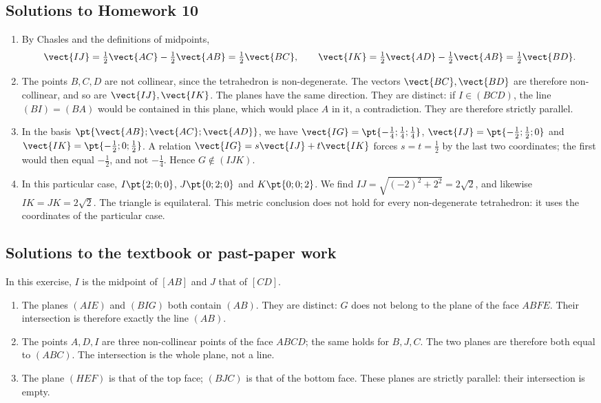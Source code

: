 \subsection{Solutions to Homework 10}\begin{enumerate}
\item By Chasles and the definitions of midpoints,
\[\vect{IJ}=\tfrac12\vect{AC}-\tfrac12\vect{AB}=\tfrac12\vect{BC},\qquad \vect{IK}=\tfrac12\vect{AD}-\tfrac12\vect{AB}=\tfrac12\vect{BD}.\]
\item The points $B,C,D$ are not collinear, since the tetrahedron is non-degenerate. The vectors $\vect{BC},\vect{BD}$ are therefore non-collinear, and so are $\vect{IJ},\vect{IK}$. The planes have the same direction. They are distinct: if $I\in(BCD)$, the line $(BI)=(BA)$ would be contained in this plane, which would place $A$ in it, a contradiction. They are therefore strictly parallel.
\item In the basis $\pt{\vect{AB};\vect{AC};\vect{AD}}$, we have $\vect{IG}=\pt{-\frac{1}{4};\frac{1}{4};\frac{1}{4}}$, $\vect{IJ}=\pt{-\frac{1}{2};\frac{1}{2};0}$ and $\vect{IK}=\pt{-\frac{1}{2};0;\frac{1}{2}}$. A relation $\vect{IG}=s\vect{IJ}+t\vect{IK}$ forces $s=t=\frac{1}{2}$ by the last two coordinates; the first would then equal $-\frac{1}{2}$, and not $-\frac{1}{4}$. Hence $G\notin(IJK)$.
\item In this particular case, $I\pt{2;0;0}$, $J\pt{0;2;0}$ and $K\pt{0;0;2}$. We find $IJ=\sqrt{(-2)^2+2^2}=2\sqrt2$, and likewise $IK=JK=2\sqrt2$. The triangle is equilateral. This metric conclusion does not hold for every non-degenerate tetrahedron: it uses the coordinates of the particular case.
\end{enumerate}

\subsection{Solutions to the textbook or past-paper work}In this exercise, $I$ is the midpoint of $[AB]$ and $J$ that of $[CD]$.
\begin{enumerate}
\item The planes $(AIE)$ and $(BIG)$ both contain $(AB)$. They are distinct: $G$ does not belong to the plane of the face $ABFE$. Their intersection is therefore exactly the line $(AB)$.
\item The points $A,D,I$ are three non-collinear points of the face $ABCD$; the same holds for $B,J,C$. The two planes are therefore both equal to $(ABC)$. The intersection is the whole plane, not a line.
\item The plane $(HEF)$ is that of the top face; $(BJC)$ is that of the bottom face. These planes are strictly parallel: their intersection is empty.
\end{enumerate}

\fi

